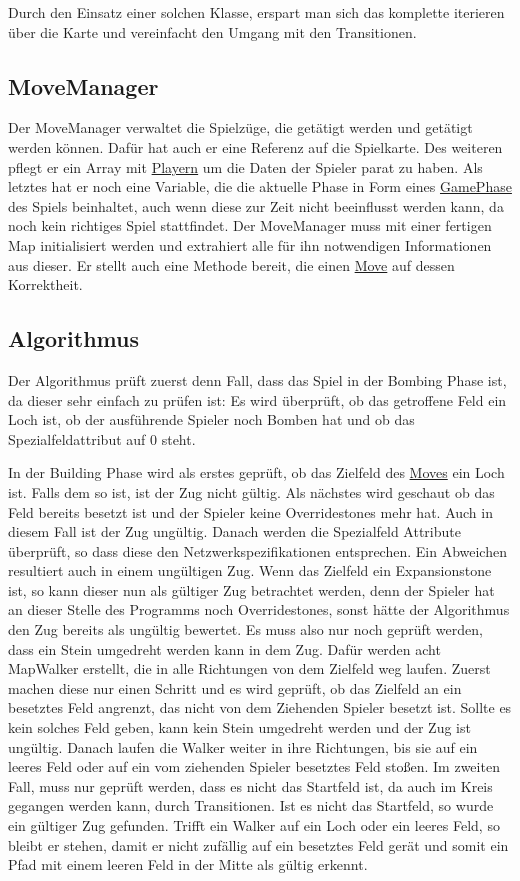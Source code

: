 Durch den Einsatz einer solchen Klasse, erspart man sich das komplette iterieren über die Karte und vereinfacht den Umgang mit den Transitionen.
\subsection{MoveManager}
\label{MoveManager}
Der MoveManager verwaltet die Spielzüge, die getätigt werden und getätigt werden können. Dafür hat auch er eine Referenz auf die Spielkarte. Des weiteren pflegt er ein Array mit \hyperref[Player]{Playern} um die Daten der Spieler parat zu haben. Als letztes hat er noch eine Variable, die die aktuelle Phase in Form eines \hyperref[GamePhase]{GamePhase} des Spiels beinhaltet, auch wenn diese zur Zeit nicht beeinflusst werden kann, da noch kein richtiges Spiel stattfindet.
Der MoveManager muss mit einer fertigen Map initialisiert werden und extrahiert alle für ihn notwendigen Informationen aus dieser.
Er stellt auch eine Methode bereit, die einen \hyperref[Move]{Move} auf dessen Korrektheit.
\subsection{Algorithmus}
Der Algorithmus prüft zuerst denn Fall, dass das Spiel in der Bombing Phase ist, da dieser sehr einfach zu prüfen ist:
Es wird überprüft, ob das getroffene Feld ein Loch ist, ob der ausführende Spieler noch Bomben hat und ob das Spezialfeldattribut auf 0 steht.

In der Building Phase wird als erstes geprüft, ob das Zielfeld des \hyperref[Move]{Moves} ein Loch ist. Falls dem so ist, ist der Zug nicht gültig. Als nächstes wird geschaut ob das Feld bereits besetzt ist und der Spieler keine Overridestones mehr hat. Auch in diesem Fall ist der Zug ungültig. Danach werden die Spezialfeld Attribute überprüft, so dass diese den Netzwerkspezifikationen entsprechen. Ein Abweichen resultiert auch in einem ungültigen Zug. Wenn das Zielfeld ein Expansionstone ist, so kann dieser nun als gültiger Zug betrachtet werden, denn der Spieler hat an dieser Stelle des Programms noch Overridestones, sonst hätte der Algorithmus den Zug bereits als ungültig bewertet. Es muss also nur noch geprüft werden, dass ein Stein umgedreht werden kann in dem Zug. Dafür werden acht MapWalker erstellt, die in alle Richtungen von dem Zielfeld weg laufen. Zuerst machen diese nur einen Schritt und es wird geprüft, ob das Zielfeld an ein besetztes Feld angrenzt, das nicht von dem Ziehenden Spieler besetzt ist. Sollte es kein solches Feld geben, kann kein Stein umgedreht werden und der Zug ist ungültig. Danach laufen die Walker weiter in ihre Richtungen, bis sie auf ein leeres Feld oder auf ein vom ziehenden Spieler besetztes Feld stoßen. Im zweiten Fall, muss nur geprüft werden, dass es nicht das Startfeld ist, da auch im Kreis gegangen werden kann, durch Transitionen. Ist es nicht das Startfeld, so wurde ein gültiger Zug gefunden. Trifft ein Walker auf ein Loch oder ein leeres Feld, so bleibt er stehen, damit er nicht zufällig auf ein besetztes Feld gerät und somit ein Pfad mit einem leeren Feld in der Mitte als gültig erkennt.

